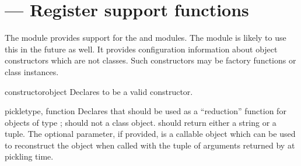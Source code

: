 \section{ ---
         Register  support functions}



The  module provides support for the
 and
 modules.  The
 module is likely to use this in the
future as well.  It provides configuration information about object
constructors which are not classes.  Such constructors may be factory
functions or class instances.


\begin{funcdesc}{constructor}{object}
  Declares  to be a valid constructor.
\end{funcdesc}

\begin{funcdesc}{pickle}{type, function}
  Declares that  should be used as a ``reduction''
  function for objects of type ;  should not a
  class object.   should return either a string or a
  tuple.  The optional  parameter, if provided, is a
  callable object which can be used to reconstruct the object when
  called with the tuple of arguments returned by  at
  pickling time.
\end{funcdesc}

